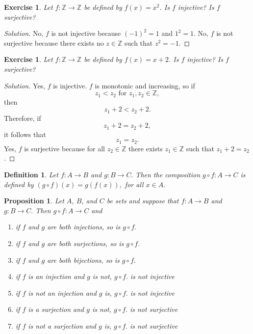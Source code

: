 \documentclass{amsart}
\newtheorem{proposition}[theorem]{Proposition}
\newtheorem{definition}[theorem]{Definition}
\newtheorem{exercise}[theorem]{Exercise}
\newcommand{\Z}{\mathbb Z}
\newcommand{\1}{\mathds{1}}
\def \Z {{\mathbb {Z}}}
\numberwithin{equation}{section}
\numberwithin{theorem}{section}
\begin{document}
\begin{exercise}
Let $f:{\mathbb Z}\rightarrow {\mathbb Z}$ be defined by $f(x)=x^2$.  Is $f$ injective?  Is $f$ surjective?

\end{exercise}

\begin{proof}[Solution]
	No, $f$ is not injective because $(-1)^2 = 1$ and $1^2=1$. No, $f$ is not surjective because there exists no $z\in\Z$ such that $z^2 = -1$.
\end{proof}

\begin{exercise}
Let $f:{\mathbb Z}\rightarrow {\mathbb Z}$ be defined by $f(x)=x+2$.  Is $f$ injective?  Is $f$ surjective?

\end{exercise}

\begin{proof}[Solution]
	Yes, $f$ is injective. $f$ is monotonic and increasing, so if $$z_1<z_2\text{ for } z_1,z_2\in\Z,$$ then $$z_1+2<z_2+2.$$ Therefore, if $$z_1+2=z_2+2,$$ it follows that $$z_1=z_2.$$ Yes, $f$ is surjective because for all $z_2\in\Z$ there exists $z_1\in\Z$ such that $z_1+2 = z_2$.
\end{proof}

\begin{definition}
Let $f:A\longrightarrow B$ and $g:B\longrightarrow C. $ Then the \emph{composition} $g\circ f: A\longrightarrow C$ is defined by $(g\circ f)(x)=g(f(x)),$ for all $x\in A.$ 
\end{definition}

\begin{proposition}  Let $A$, $B$, and $C$ be sets and suppose that $f:A\longrightarrow B$  and  $g:B\longrightarrow C.$  Then $g\circ f:A\longrightarrow C$ and
\begin{enumerate}
\item[a)] if $f$ and $g$ are both injections, so is $g\circ f.$

\item[b)] if $f$ and $g$ are both surjections, so is $g\circ f.$

\item[c)] if $f$ and $g$ are both bijections, so is $g\circ f.$

\item[d)] if $f$ is an injection and $g$ is not, $g\circ f.$ is not injective

\item[e)] if $f$ is not an injection and $g$ is, $g\circ f.$ is not injective

\item[f)] if $f$ is a surjection and $g$ is not, $g\circ f.$ is not surjective

\item[g)] if $f$ is not a surjection and $g$ is, $g\circ f.$ is not surjective

\end{enumerate}
\end{proposition} 
\end{document}
